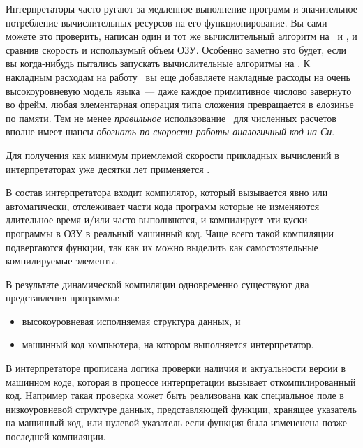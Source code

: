 \label{dyna}\secdown

Интерпретаторы часто ругают за медленное выполнение программ и значительное
потребление вычислительных ресурсов на его
функционирование. Вы сами можете это проверить, написан один и тот же
вычислительный алгоритм на \py{}\ и
\cpp, и сравнив скорость и использумый объем ОЗУ. Особенно заметно это будет,
если вы когда-нибудь пытались запускать вычислительные алгоритмы на \metal. К
накладным расходам на работу \py\ вы еще добавляете накладные расходы на очень
высокоуровневую модель языка\ --- даже каждое примитивное числово завернуто во
фрейм, любая элементарная операция типа сложения превращается в елозинье по
памяти. Тем не менее \emph{правильное} использование \metal\ для численных
расчетов вполне имеет шансы \textit{обогнать по скорости работы аналогичный код
на Си}.

Для получения как минимум приемлемой скорости прикладных вычислений в
интерпретаторах уже десятки лет применяется .

В состав интерпретатора входит компилятор, который вызывается явно или
автоматически, отслеживает части кода программ которые не изменяются длительное
время и/или часто выполняются, и компилирует эти куски программы в ОЗУ в
реальный машинный код. Чаще всего такой компиляции подвергаются функции, так
как их можно выделить как самостоятельные компилируемые элементы. 

В результате динамической компиляции одновременно существуют два представления
программы:
\begin{itemize}[nosep]
\item высокоуровневая исполняемая структура данных, и
\item машинный код компьютера, на котором выполняется интерпретатор.
\end{itemize}
В интерпретаторе прописана логика проверки наличия и актуальности версии в
машинном коде, которая в процессе интерпретации вызывает откомпилированный код.
Например такая проверка может быть реализована как специальное поле в
низкоуровневой структуре данных, представляющей функции, хранящее указатель на
машинный код, или нулевой указатель если функция была измененена позже последней
компиляции.




\secup
